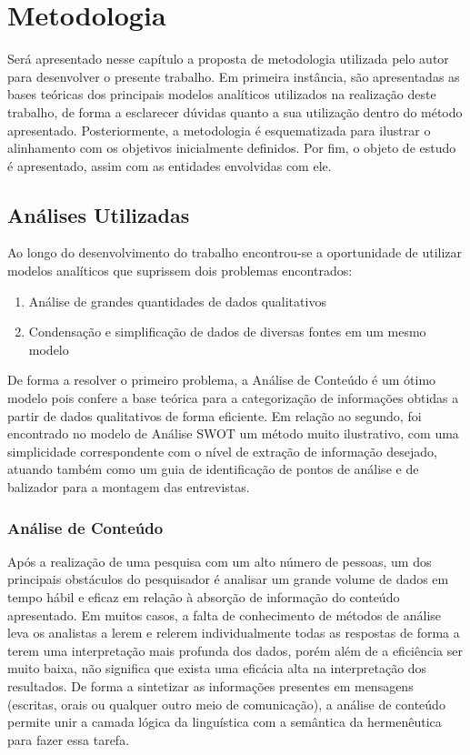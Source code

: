 
\chapter{Metodologia}

Será apresentado nesse capítulo a proposta de metodologia utilizada pelo autor para desenvolver o presente trabalho. Em primeira instância, são apresentadas as bases teóricas dos principais modelos analíticos utilizados na realização deste trabalho, de forma a esclarecer dúvidas quanto a sua utilização dentro do método apresentado. Posteriormente, a metodologia é esquematizada para ilustrar o alinhamento com os objetivos inicialmente definidos. Por fim, o objeto de estudo é apresentado, assim com as entidades envolvidas com ele.

\section{Análises Utilizadas}

Ao longo do desenvolvimento do trabalho encontrou-se a oportunidade de utilizar modelos analíticos que suprissem dois problemas encontrados: 

\begin{enumerate}
\item Análise de grandes quantidades de dados qualitativos
\item Condensação e simplificação de dados de diversas fontes em um mesmo modelo
\end{enumerate} 

De forma a resolver o primeiro problema, a Análise de Conteúdo é um ótimo modelo pois confere a base teórica para a categorização de informações obtidas a partir de dados qualitativos de forma eficiente. Em relação ao segundo, foi encontrado no modelo de Análise SWOT um método muito ilustrativo, com uma simplicidade correspondente com o nível de extração de informação desejado, atuando também como um guia de identificação de pontos de análise e de balizador para a montagem das entrevistas.

\subsection{Análise de Conteúdo}
\label{cha:analise_conteudo}

Após a realização de uma pesquisa com um alto número de pessoas, um dos principais obstáculos do pesquisador é analisar um grande volume de dados em tempo hábil e eficaz em relação à absorção de informação do conteúdo apresentado. Em muitos casos, a falta de conhecimento de métodos de análise leva os analistas a lerem e relerem individualmente todas as respostas de forma a terem uma interpretação mais profunda dos dados, porém além de a eficiência ser muito baixa, não significa que exista uma eficácia alta na interpretação dos resultados. De forma a sintetizar as informações presentes em mensagens (escritas, orais ou qualquer outro meio de comunicação), a análise de conteúdo permite unir a camada lógica da linguística com a semântica da hermenêutica para fazer essa tarefa.

